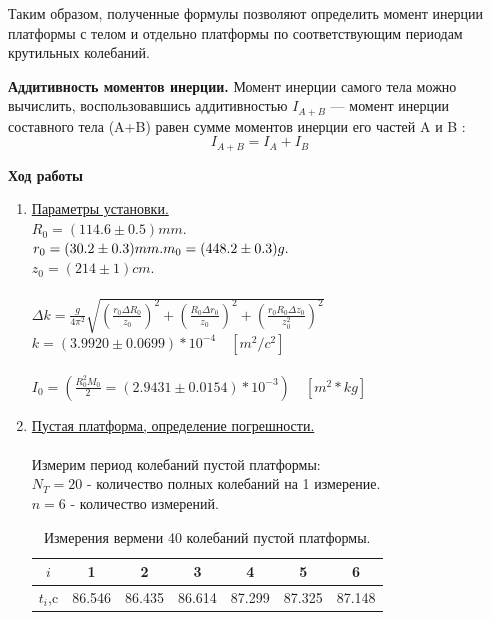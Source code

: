 \documentclass[12pt]{article}
\begin{document}
    Таким образом, полученные формулы позволяют определить момент
    инерции платформы с телом и отдельно платформы по соответствующим периодам крутильных колебаний.

    \textbf{Аддитивность моментов инерции.} Момент инерции самого тела можно вычислить, воспользовавшись аддитивностью $I_{A+B}$ — момент инерции составного тела (A+B) равен сумме моментов инерции его частей A и B :
        \begin{equation}
            I_{A+B} = I_A + I_B
        \end{equation}

    \clearpage
    \textbf{\large Ход работы}
    \begin{enumerate} 
        \item \underline{Параметры установки.} \\\newline
            $R_0 = (114.6 \pm 0.5)mm.$ \\ $r_0 = (30.2 \pm 0.3)mm. \\
            m_0 = (448.2 \pm 0.3)g.$ \\ $z_0 = (214 \pm 1)cm.$\\ \\
            $\Delta k = \frac{g}{4\pi^2} \sqrt{(\frac{r_0 \Delta R_0}{z_0})^2 + (\frac{R_0 \Delta r_0}{z_0})^2 
            + (\frac{r_0R_0 \Delta z_0}{z_0^2})^2}$ \\
            $ k = (3.9920 \pm 0.0699)* 10 ^ {-4} \quad [m^2 / c^2]$ \\ \\
            $I_0 = (\frac{R_0^2 M_0}{2} = (2.9431 \pm 0.0154) * 10 ^{-3}) \quad [m^2 * kg]$

        \item \underline{Пустая платформа, определение погрешности.} \\ \\
            Измерим период колебаний пустой платформы: \\
            $N_T = 20$ - количество полных колебаний на 1 измерение. \\
            $n = 6$ - количество измерений. 
            
            \begin{table}[ht]
                \caption{Измерения вермени 40 колебаний пустой платформы.}
                \begin{center}
                \begin{tabular}{|c|c|c|c|c|c|c|}
                \hline 
                $i$ & 1 & 2 & 3 & 4 & 5 & 6 \\
                \hline
                $t_i$,c & 86.546 & 86.435 & 86.614 & 87.299 & 87.325 & 87.148 \\
                \hline
                \end{tabular}
                \end{center}
            \end{table}


\end{enumerate}
\end{document}
